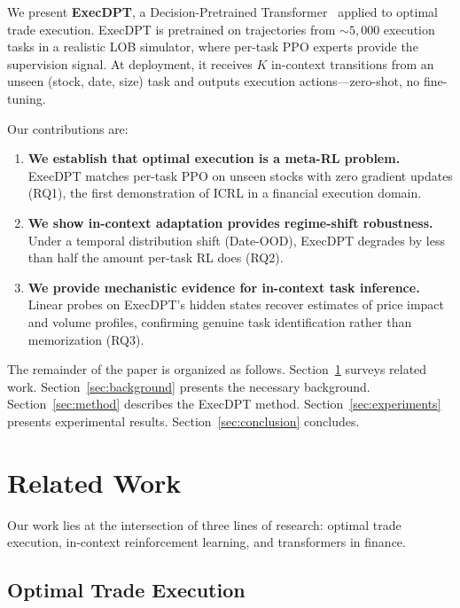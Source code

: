 \documentclass[sigconf,review,anonymous]{acmart}
\begin{document}
We present \textbf{ExecDPT}, a Decision-Pretrained Transformer~\cite{lee2023supervised} applied to optimal trade execution.
ExecDPT is pretrained on trajectories from ${\sim}5{,}000$ execution tasks in a realistic LOB simulator, where per-task PPO experts provide the supervision signal.
At deployment, it receives $K$ in-context transitions from an unseen (stock, date, size) task and outputs execution actions---zero-shot, no fine-tuning.

Our contributions are:
\begin{enumerate}
    \item \textbf{We establish that optimal execution is a meta-RL problem.} ExecDPT matches per-task PPO on unseen stocks with zero gradient updates (RQ1), the first demonstration of ICRL in a financial execution domain.
    \item \textbf{We show in-context adaptation provides regime-shift robustness.} Under a temporal distribution shift (Date-OOD), ExecDPT degrades by less than half the amount per-task RL does (RQ2).
    \item \textbf{We provide mechanistic evidence for in-context task inference.} Linear probes on ExecDPT's hidden states recover estimates of price impact and volume profiles, confirming genuine task identification rather than memorization (RQ3).
\end{enumerate}

The remainder of the paper is organized as follows.
Section~\ref{sec:related} surveys related work.
Section~\ref{sec:background} presents the necessary background.
Section~\ref{sec:method} describes the ExecDPT method.
Section~\ref{sec:experiments} presents experimental results.
Section~\ref{sec:conclusion} concludes.


\section{Related Work}\label{sec:related}

Our work lies at the intersection of three lines of research: optimal trade execution, in-context reinforcement learning, and transformers in finance.

\subsection{Optimal Trade Execution}
\end{document}
